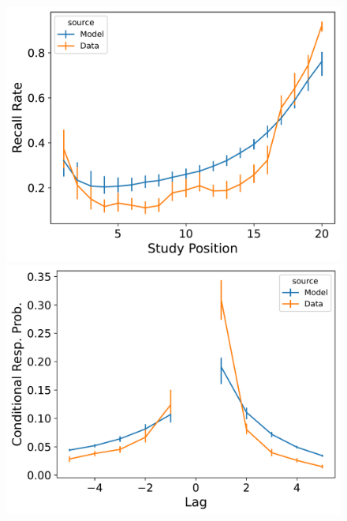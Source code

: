 \documentclass[
  letterpaper,
  11pt,
  english,
  singlespacing,
  headsepline]{MastersDoctoralThesis}
\begin{document}
\begin{figure}
\begin{minipage}{0.33\linewidth}
\includegraphics{icmr_figures/Murdock1962_ConnectionistCMR_Model_Fitting_LL20_spc-1.png}\end{minipage}%
\newline
\begin{minipage}{0.33\linewidth}
\includegraphics{icmr_figures/Murdock1962_InstanceCMR_Model_Fitting_LL20_crp-1.png}\end{minipage}%
%
\begin{minipage}{0.33\linewidth}

\end{minipage}
\end{figure}
\end{document}
